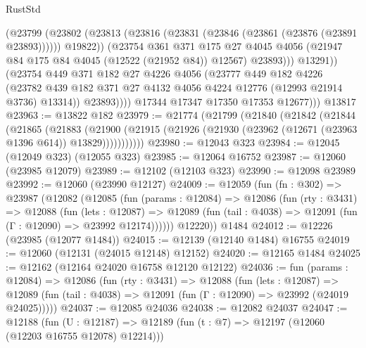 \begin{lexlean}{RustStd}
\begin{coremodule}
                      (@23799
                        (@23802
                          (@23813
                            (@23816 (@23831 (@23846 (@23861 (@23876 (@23891 @23893))))))
                            @19822))
                        (@23754
                          @361
                          @371
                          @175
                          @27
                          @4045
                          @4056
                          (@21947 @84 @175 @84 @4045 (@12522 (@21952 @84)) @12567)
                          @23893)))
                    @13291))
                (@23754
                  @449
                  @371
                  @182
                  @27
                  @4226
                  @4056
                  (@23777
                    @449
                    @182
                    @4226
                    (@23782
                      @439
                      @182
                      @371
                      @27
                      @4132
                      @4056
                      @4224
                      @12776
                      (@12993 @21914 @3736)
                      @13314))
                  @23893))))
          @17344
          @17347
          @17350
          @17353
          @12677)))
    @13817
@23963 := @13822 @182
@23979 := @21774
    (@21799
      (@21840
        (@21842
          (@21844
            (@21865
              (@21883
                (@21900
                  (@21915 (@21926 (@21930 (@23962 (@12671 (@23963 @1396 @614)) @13829)))))))))))
@23980 := @12043 @323
@23984 := @12045 (@12049 @323) (@12055 @323)
@23985 := @12064 @16752
@23987 := @12060 (@23985 @12079)
@23989 := @12102 (@12103 @323)
@23990 := @12098 @23989
@23992 := @12060 (@23990 @12127)
@24009 := @12059
    (fun (fn : @302) =>
    @23987
      (@12082
        (@12085
          (fun (params : @12084) =>
          @12086
            (fun (rty : @3431) =>
            @12088
              (fun (lets : @12087) =>
              @12089 (fun (tail : @4038) => @12091 (fun (Γ : @12090) => @23992 @12174))))))
        @12220))
    @1484
@24012 := @12226 (@23985 (@12077 @1484))
@24015 := @12139 (@12140 @1484) @16755
@24019 := @12060 (@12131 (@24015 @12148) @12152)
@24020 := @12165 @1484
@24025 := @12162 (@12164 @24020 @16758 @12120 @12122)
@24036 := fun (params : @12084) =>
  @12086
    (fun (rty : @3431) =>
    @12088
      (fun (lets : @12087) =>
      @12089 (fun (tail : @4038) => @12091 (fun (Γ : @12090) => @23992 (@24019 @24025)))))
@24037 := @12085 @24036
@24038 := @12082 @24037
@24047 := @12188
    (fun (U : @12187) => @12189 (fun (t : @7) => @12197 (@12060 (@12203 @16755 @12078) @12214)))

\end{coremodule}
\end{lexlean}
